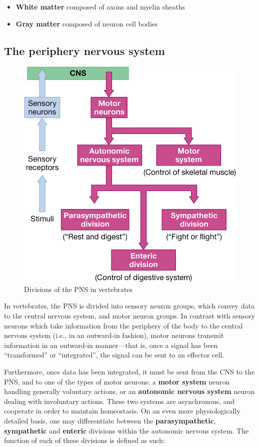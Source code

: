 \documentclass{article}
\begin{document}
\begin{itemize}
	\item \textbf{White matter} composed of axons and myelin sheaths
	\item \textbf{Gray matter} composed of neuron cell bodies
\end{itemize}

\subsection{The periphery nervous system}

\begin{figure}
	\centering
	\includegraphics[width=0.9\linewidth]{cns_out_in_flow.png}
	\caption{Divisions of the PNS in vertebrates}
\end{figure}

In vertebrates, the PNS is divided into sensory neuron groups, which convey data
to the central nervous system, and motor neuron groups. In contrast with sensory
neurons which take information from the periphery of the body to the central
nervous system (i.e., in an outward-in fashion), motor neurons transmit information
in an outward-in manner---that is, once a signal has been ``transformed'' or
``integrated'', the signal can be sent to an effector cell.

Furthermore, once data has been integrated, it must be sent from the CNS to the
PNS, and to one of the types of motor neurons: a \textbf{motor system} neuron
handling generally voluntary actions, or an \textbf{autonomic nervous system}
neuron dealing with involuntary actions. These two systems are asynchronous,
and cooperate in order to maintain homeostasis.  On an even more
physiologically detailed basis, one may differentiate between the
\textbf{parasympathetic}, \textbf{sympathetic} and \textbf{enteric} divisions
within the autonomic nervous system. The function of each of these divisions
is defined as such:
\end{document}
